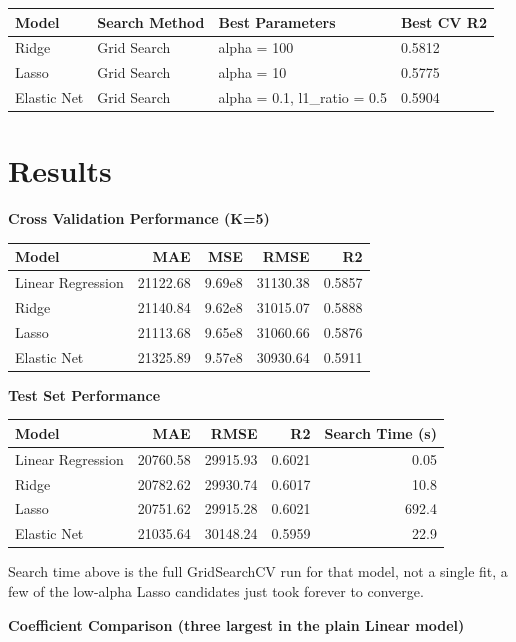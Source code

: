 \documentclass[12pt,a4paper]{article}
\begin{document}
\vspace{0.3cm}
\begin{tabular}{llll}
\toprule
Model & Search Method & Best Parameters & Best CV R2 \\
\midrule
Ridge & Grid Search & alpha = 100 & 0.5812 \\
Lasso & Grid Search & alpha = 10 & 0.5775 \\
Elastic Net & Grid Search & alpha = 0.1, l1\_ratio = 0.5 & 0.5904 \\
\bottomrule
\end{tabular}

\section{Results}

\textbf{Cross Validation Performance (K=5)}

{\small
\begin{tabular}{p{2.6cm}rrrr}
\toprule
Model & MAE & MSE & RMSE & R2 \\
\midrule
Linear Regression & 21122.68 & 9.69e8 & 31130.38 & 0.5857 \\
Ridge & 21140.84 & 9.62e8 & 31015.07 & 0.5888 \\
Lasso & 21113.68 & 9.65e8 & 31060.66 & 0.5876 \\
Elastic Net & 21325.89 & 9.57e8 & 30930.64 & 0.5911 \\
\bottomrule
\end{tabular}
}

\vspace{0.3cm}
\textbf{Test Set Performance}

{\small
\begin{tabular}{p{2.6cm}rrrr}
\toprule
Model & MAE & RMSE & R2 & Search Time (s) \\
\midrule
Linear Regression & 20760.58 & 29915.93 & 0.6021 & 0.05 \\
Ridge & 20782.62 & 29930.74 & 0.6017 & 10.8 \\
Lasso & 20751.62 & 29915.28 & 0.6021 & 692.4 \\
Elastic Net & 21035.64 & 30148.24 & 0.5959 & 22.9 \\
\bottomrule
\end{tabular}
}

Search time above is the full GridSearchCV run for that model, not a single fit, a few of the low-alpha
Lasso candidates just took forever to converge.

\vspace{0.3cm}
\textbf{Coefficient Comparison (three largest in the plain Linear model)}
\end{document}

